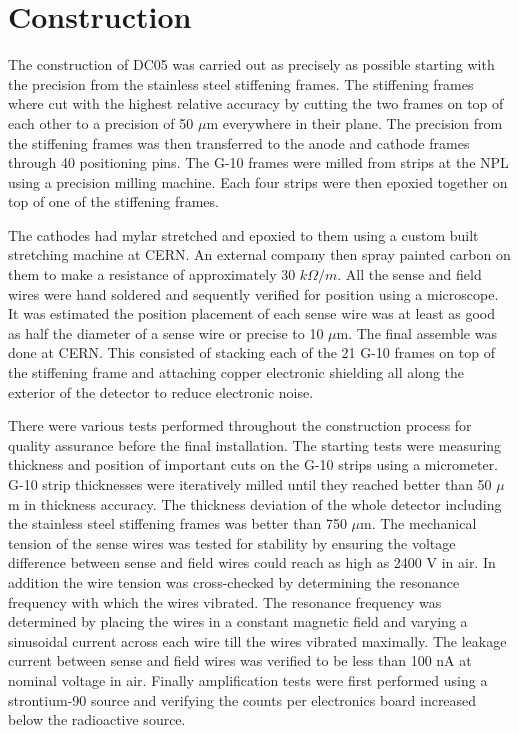 
\section{Construction}
The construction of DC05 was carried out as precisely as possible starting with
the precision from the stainless steel stiffening frames.  The stiffening frames
where cut with the highest relative accuracy by cutting the two frames on top of
each other to a precision of 50 $\mu$m everywhere in their plane.  The precision
from the stiffening frames was then transferred to the anode and cathode frames
through 40 positioning pins.  The G-10 frames were milled from strips at the NPL
using a precision milling machine.  Each four strips were then epoxied together
on top of one of the stiffening frames.  \par The cathodes had mylar stretched
and epoxied to them using a custom built stretching machine at CERN.  An
external company then spray painted carbon on them to make a resistance of
approximately 30 $k\Omega /m$.  All the sense and field wires were hand soldered
and sequently verified for position using a microscope.  It was estimated the
position placement of each sense wire was at least as good as half the diameter
of a sense wire or precise to 10 $\mu$m.  The final assemble was done at CERN.
This consisted of stacking each of the 21 G-10 frames on top of the stiffening
frame and attaching copper electronic shielding all along the exterior of the
detector to reduce electronic noise. \par There were various tests performed
throughout the construction process for quality assurance before the final
installation.  The starting tests were measuring thickness and position of
important cuts on the G-10 strips using a micrometer.  G-10 strip thicknesses
were iteratively milled until they reached better than 50 $\mu$m in thickness
accuracy.  The thickness deviation of the whole detector including the stainless
steel stiffening frames was better than 750 $\mu$m.  The mechanical tension of
the sense wires was tested for stability by ensuring the voltage difference
between sense and field wires could reach as high as 2400 V in air.  In addition
the wire tension was cross-checked by determining the resonance frequency with
which the wires vibrated.  The resonance frequency was determined by placing the
wires in a constant magnetic field and varying a sinusoidal current across each
wire till the wires vibrated maximally.  The leakage current between sense and
field wires was verified to be less than 100 nA at nominal voltage in air.
Finally amplification tests were first performed using a strontium-90 source and
verifying the counts per electronics board increased below the radioactive
source.

